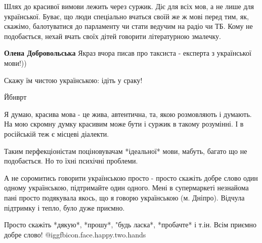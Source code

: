 Шлях до красивої вимови лежить через суржик. Діє для всіх мов, а не лише для
української. Буває, що люди спеціально вчаться своїй же ж мові перед тим, як,
скажімо, балотуватися до парламенту чи стати ведучим на радіо чи ТБ. Кому не
подобається, нехай вчать своїх дітей говорити літературною змалечку.


 
\textbf{Олена Добровольська}
Якраз вчора писав про таксиста - експерта з української мови!))

 
Скажу їм чистою українською: ідіть у сраку!

 
Йбнврт

 

Я думаю, красива мова - це жива, автентична, та, якою розмовляють і думають. На
мою скромну думку красивим може бути і суржик в такому розумінні. І в
російській теж є місцеві діалекти.

Таким перфекціоністам поціновувачам *ідеальної* мови, мабуть, багато що не
подобається. Но то їхні психічні проблеми.

А не соромитись говорити українською просто - просто скажіть добре слово один
одному українською, підтримайте один одного. Мені в супермаркеті незнайома пані
просто подякувала якось, що я говорю українською (м. Дніпро). Відчула підтримку
і тепло, було дуже приємно.

Просто скажіть *дякую*, *прошу*, "будь ласка*, *пробачте* і т.ін. Всім приємно
добре слово!  @igg{fbicon.face.happy.two.hands} 


